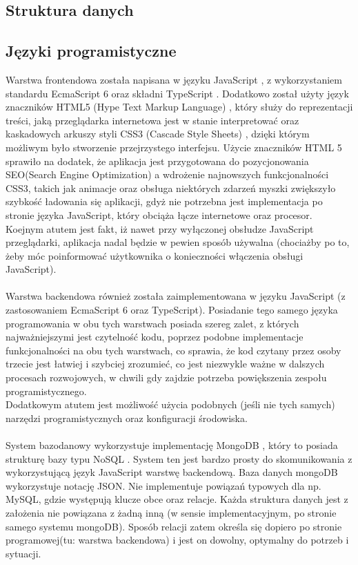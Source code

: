 \documentclass[eng,printmode]{mgr}
\begin{document}
\subsection{Struktura danych}

\subsection{Języki programistyczne}
Warstwa frontendowa została napisana w języku JavaScript \cite{JS}, z wykorzystaniem standardu EcmaScript 6 \cite{ES6} oraz składni TypeScript \cite{TS}. Dodatkowo został użyty język znaczników HTML5 (Hype Text Markup Language) \cite{HTML5}, który służy do reprezentacji treści, jaką przeglądarka internetowa jest w stanie interpretować oraz kaskadowych arkuszy styli CSS3 (Cascade Style Sheets) \cite{CSS3}, dzięki którym możliwym było stworzenie przejrzystego interfejsu. Użycie znaczników HTML 5 sprawiło na dodatek, że aplikacja jest przygotowana do pozycjonowania SEO(Search Engine Optimization) \cite{HTML_SEO} a wdrożenie najnowszych funkcjonalności CSS3, takich jak animacje oraz obsługa niektórych zdarzeń myszki zwiększyło szybkość ładowania się aplikacji, gdyż nie potrzebna jest implementacja po stronie języka JavaScript, który obciąża łącze internetowe oraz procesor. Koejnym atutem jest fakt, iż nawet przy wyłączonej obsłudze JavaScript przeglądarki, aplikacja nadal będzie w pewien sposób używalna (chociażby po to, żeby móc poinformować użytkownika o konieczności włączenia obsługi JavaScript).
\\
\\
Warstwa backendowa również została zaimplementowana w języku JavaScript (z zastosowaniem EcmaScript 6 oraz TypeScript). Posiadanie tego samego języka programowania w obu tych warstwach posiada szereg zalet, z których najważniejszymi jest czytelność kodu, poprzez podobne implementacje funkcjonalności na obu tych warstwach, co sprawia, że kod czytany przez osoby trzecie jest łatwiej i szybciej zrozumieć, co jest niezwykle ważne w dalszych procesach rozwojowych, w chwili gdy zajdzie potrzeba powiększenia zespołu programistycznego.
\\
Dodatkowym atutem jest możliwość użycia podobnych (jeśli nie tych samych) narzędzi programistycznych oraz konfiguracji środowiska.
\\
\\
System bazodanowy wykorzystuje implementację MongoDB \cite{MongoDB}, który to posiada strukturę bazy typu NoSQL \cite{NO_SQL}. System ten jest bardzo prosty do skomunikowania z wykorzystującą język JavaScript warstwę backendową. Baza danych mongoDB wykorzystuje notację JSON. Nie implementuje powiązań typowych dla np. MySQL, gdzie występują klucze obce oraz relacje. Każda struktura danych jest z założenia nie powiązana z żadną inną (w sensie implementacyjnym, po stronie samego systemu mongoDB). Sposób relacji zatem określa się dopiero po stronie programowej(tu: warstwa backendowa) i jest on dowolny, optymalny do potrzeb i sytuacji.
\end{document}
